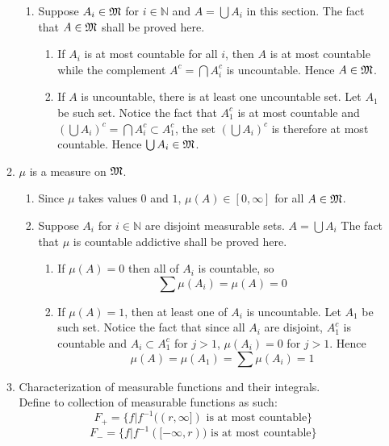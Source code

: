 \documentclass{article}
\begin{document}
\begin{enumerate}
\begin{enumerate}
\begin{enumerate}
 			\item Suppose $A_i\in\mathfrak{M}$ for $i\in\mathbb{N}$ and $A=\bigcup A_i$ in this section. The fact that $A\in\mathfrak{M}$ shall be proved here.
 			\begin{enumerate}
 				 \item If $A_i$ is at most countable for all $i$, then $A$ is at most countable while the complement $A^c=\bigcap A_i^c$ is uncountable. Hence $A\in\mathfrak{M}$. 
 				 \item If $A$ is uncountable, there is at least one uncountable set. Let $A_1$ be such set. Notice the fact that $A_1^c$ is at most countable and $(\bigcup A_i)^c=\bigcap A_i^c\subset A_1^c$, the set $(\bigcup A_i)^c$ is therefore at most countable. Hence $\bigcup A_i\in\mathfrak{M}$.
 			\end{enumerate}
 		\end{enumerate}
 		\item $\mu$ is a measure on $\mathfrak{M}$.
 		\begin{enumerate}
 			\item Since $\mu$ takes values $0$ and $1$, $\mu(A)\in[0,\infty]$ for all $A\in\mathfrak{M}$.
 			\item Suppose $A_i$  for $i\in\mathbb{N}$ are disjoint measurable sets. $A=\bigcup A_i$ The fact that $\mu$ is countable addictive shall be proved here.
 				\begin{enumerate}
 					\item If $\mu(A)=0$ then all of $A_i$ is countable, so
 					\[
 						\sum\mu(A_i)=\mu(A)=0
 					\]
 					\item If $\mu(A)=1$, then at least one of $A_i$ is uncountable. Let $A_1$ be such set. Notice the fact that since all $A_i$ are disjoint, $A_1^c$ is countable and $A_i\subset A_1^c$ for $j>1$, $\mu(A_i)=0$ for $j>1$. Hence
 					\[
 						\mu(A)=\mu(A_1)=\sum\mu(A_i)=1
 					\]
 				\end{enumerate}
 		\end{enumerate}
 		\item Characterization of measurable functions and their integrals.\\
 		Define to collection of measurable functions as such:
 		\[
 			F_{+}=\{f|f^{-1}((r,\infty])\text{ is at most countable}\}
 		\]
 		\[
 			F_{-}=\{f|f^{-1}([-\infty,r))\text{ is at most countable}\}
 		\]
 		

\end{enumerate}
\end{enumerate}
\end{document}

